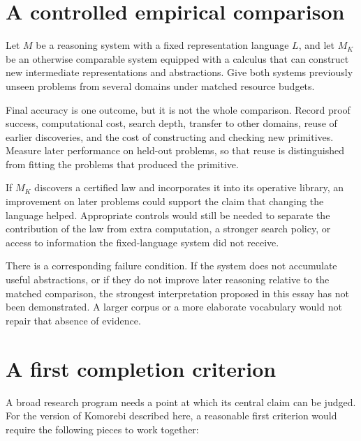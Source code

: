 \documentclass[11pt,oneside,openany]{book}
\begin{document}
\section{A controlled empirical comparison}
Let \(M\) be a reasoning system with a fixed representation language \(L\), and let \(M_K\) be an otherwise comparable system equipped with a calculus that can construct new intermediate representations and abstractions. Give both systems previously unseen problems from several domains under matched resource budgets.

Final accuracy is one outcome, but it is not the whole comparison. Record proof success, computational cost, search depth, transfer to other domains, reuse of earlier discoveries, and the cost of constructing and checking new primitives. Measure later performance on held-out problems, so that reuse is distinguished from fitting the problems that produced the primitive.

If \(M_K\) discovers a certified law and incorporates it into its operative library, an improvement on later problems could support the claim that changing the language helped. Appropriate controls would still be needed to separate the contribution of the law from extra computation, a stronger search policy, or access to information the fixed-language system did not receive.

There is a corresponding failure condition. If the system does not accumulate useful abstractions, or if they do not improve later reasoning relative to the matched comparison, the strongest interpretation proposed in this essay has not been demonstrated. A larger corpus or a more elaborate vocabulary would not repair that absence of evidence.

\section{A first completion criterion}
A broad research program needs a point at which its central claim can be judged. For the version of Komorebi described here, a reasonable first criterion would require the following pieces to work together:
\end{document}
